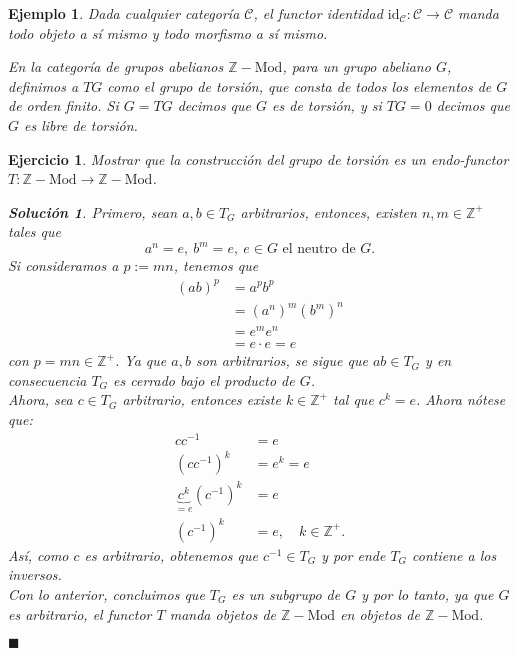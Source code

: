 \documentclass[12pt,letterpaper,titlepage]{article}
\newcommand{\xqed}[1]{%
  \leavevmode\unskip\penalty9999 \hbox{}\nobreak\hfill
  \quad\hbox{\ensuremath{#1}}}
\newtheorem{exe}{Ejercicio}
\newtheorem*{exa}{Ejemplo}
\theoremstyle{definition}
\newtheorem*{soltemp}{Solución}
\newenvironment{sol}[1]{%
    \begin{soltemp}#1}{%
    \xqed{\blacksquare}\end{soltemp}%
}
\newcommand\Z{\mathbb Z}
\renewcommand\cal[1]{\mathcal{#1}}
\newcommand\<{\langle}
\renewcommand\>{\rangle}
\newcommand{\id}{\mathrm{id}}
\begin{document}
    \begin{exa}
    \item Dada cualquier categoría $\cal C$, el functor identidad
        $\id_{\cal C}:\cal C\to\cal C$ manda todo objeto a sí mismo y todo
        morfismo a sí mismo.
    \item En la categoría de grupos abelianos $\Z-\mathrm{Mod}$, para un grupo abeliano $G$,     definimos a $TG$ como el grupo de torsión, que consta de todos los elementos de $G$ de orden finito. Si $G=TG$ decimos que $G$ es de torsión, y si $TG=0$ decimos que $G$ es libre de torsión.
    \end{exa}
    
    \begin{exe}%
        Mostrar que la construcción del grupo de torsión
        es un endo-functor $T:\Z-\mathrm{Mod}\to\Z-\mathrm{Mod}$.
        \begin{sol}
    Primero, sean $a,b\in T_G$ arbitrarios, entonces, existen $n,m\in\Z^+$ tales que
    \begin{equation*}
        a^n=e,\ b^m=e,\ e\in G \text{ el neutro de } G.
    \end{equation*}
    Si consideramos a $p:=mn$, tenemos que 
    \begin{align*}
        (ab)^p & = a^p b^p \\
               & = (a^n)^m (b^m)^n \\
               & = e^m e^n \\
               & = e \cdot e = e
    \end{align*}
    con $p=mn\in\Z^+$. Ya que $a,b$ son arbitrarios, se sigue que $ab\in T_G$ y en consecuencia $T_G$ es cerrado bajo el producto de $G$.\\
    Ahora, sea $c\in T_G$ arbitrario, entonces existe $k\in\Z^+$ tal que $c^k=e$. Ahora nótese que:
    \begin{align*}
        cc^{-1} & = e \\
        (cc^{-1})^k & = e^k = e \\
        \underbrace{c^k}_{=e}(c^{-1})^k & = e \\
        (c^{-1})^k & = e,\quad k\in\Z^+.
    \end{align*}
    Así, como $c$ es arbitrario, obtenemos que $c^{-1}\in T_G$ y por ende $T_G$ contiene a los inversos.\\
    Con lo anterior, concluimos que $T_G$ es un subgrupo de $G$ y por lo tanto, ya que $G$ es arbitrario, el functor $T$ manda objetos de $\Z-\mathrm{Mod}$ en objetos de $\Z-\mathrm{Mod}$.

\end{sol}
\end{exe}
\end{document}
